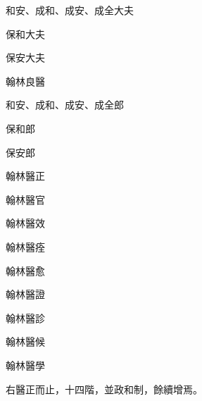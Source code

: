 \begin{pinyinscope}
 和安、成和、成安、成全大夫



 保和大夫



 保安大夫



 翰林良醫



 和安、成和、成安、成全郎



 保和郎



 保安郎



 翰林醫正



 翰林醫官



 翰林醫效



 翰林醫痊



 翰林醫愈



 翰林醫證



 翰林醫診



 翰林醫候



 翰林醫學



 右醫正而止，十四階，並政和制，餘續增焉。



\end{pinyinscope}